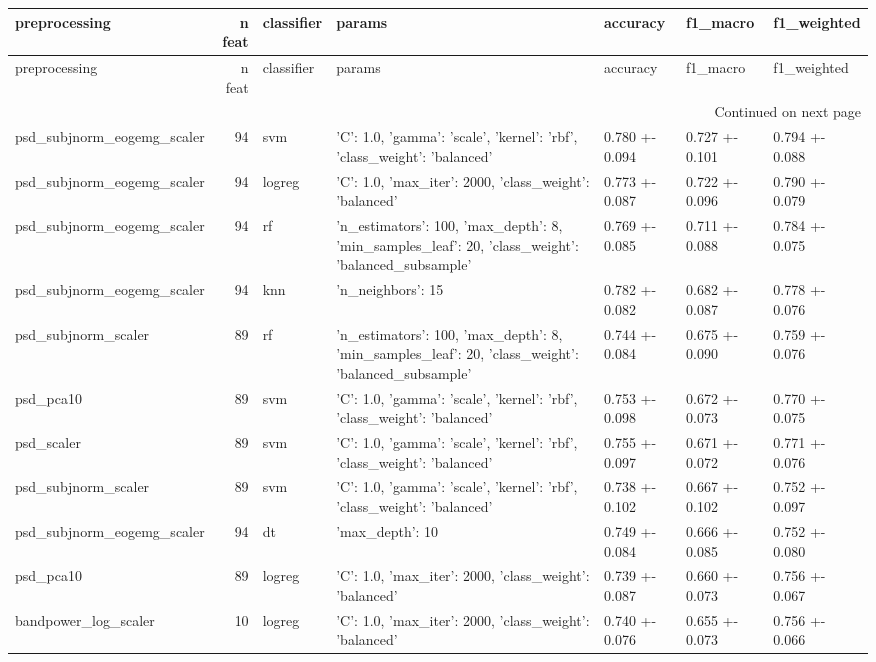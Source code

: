 \begin{longtable}{lrlllll}
\toprule
preprocessing & n feat & classifier & params & accuracy & f1_macro & f1_weighted \\
\midrule
\endfirsthead
\toprule
preprocessing & n feat & classifier & params & accuracy & f1_macro & f1_weighted \\
\midrule
\endhead
\midrule
\multicolumn{7}{r}{Continued on next page} \\
\midrule
\endfoot
\bottomrule
\endlastfoot
psd_subjnorm_eogemg_scaler & 94 & svm & {'C': 1.0, 'gamma': 'scale', 'kernel': 'rbf', 'class_weight': 'balanced'} & 0.780 +- 0.094 & 0.727 +- 0.101 & 0.794 +- 0.088 \\
psd_subjnorm_eogemg_scaler & 94 & logreg & {'C': 1.0, 'max_iter': 2000, 'class_weight': 'balanced'} & 0.773 +- 0.087 & 0.722 +- 0.096 & 0.790 +- 0.079 \\
psd_subjnorm_eogemg_scaler & 94 & rf & {'n_estimators': 100, 'max_depth': 8, 'min_samples_leaf': 20, 'class_weight': 'balanced_subsample'} & 0.769 +- 0.085 & 0.711 +- 0.088 & 0.784 +- 0.075 \\
psd_subjnorm_eogemg_scaler & 94 & knn & {'n_neighbors': 15} & 0.782 +- 0.082 & 0.682 +- 0.087 & 0.778 +- 0.076 \\
psd_subjnorm_scaler & 89 & rf & {'n_estimators': 100, 'max_depth': 8, 'min_samples_leaf': 20, 'class_weight': 'balanced_subsample'} & 0.744 +- 0.084 & 0.675 +- 0.090 & 0.759 +- 0.076 \\
psd_pca10 & 89 & svm & {'C': 1.0, 'gamma': 'scale', 'kernel': 'rbf', 'class_weight': 'balanced'} & 0.753 +- 0.098 & 0.672 +- 0.073 & 0.770 +- 0.075 \\
psd_scaler & 89 & svm & {'C': 1.0, 'gamma': 'scale', 'kernel': 'rbf', 'class_weight': 'balanced'} & 0.755 +- 0.097 & 0.671 +- 0.072 & 0.771 +- 0.076 \\
psd_subjnorm_scaler & 89 & svm & {'C': 1.0, 'gamma': 'scale', 'kernel': 'rbf', 'class_weight': 'balanced'} & 0.738 +- 0.102 & 0.667 +- 0.102 & 0.752 +- 0.097 \\
psd_subjnorm_eogemg_scaler & 94 & dt & {'max_depth': 10} & 0.749 +- 0.084 & 0.666 +- 0.085 & 0.752 +- 0.080 \\
psd_pca10 & 89 & logreg & {'C': 1.0, 'max_iter': 2000, 'class_weight': 'balanced'} & 0.739 +- 0.087 & 0.660 +- 0.073 & 0.756 +- 0.067 \\
bandpower_log_scaler & 10 & logreg & {'C': 1.0, 'max_iter': 2000, 'class_weight': 'balanced'} & 0.740 +- 0.076 & 0.655 +- 0.073 & 0.756 +- 0.066 \\

\end{longtable}

